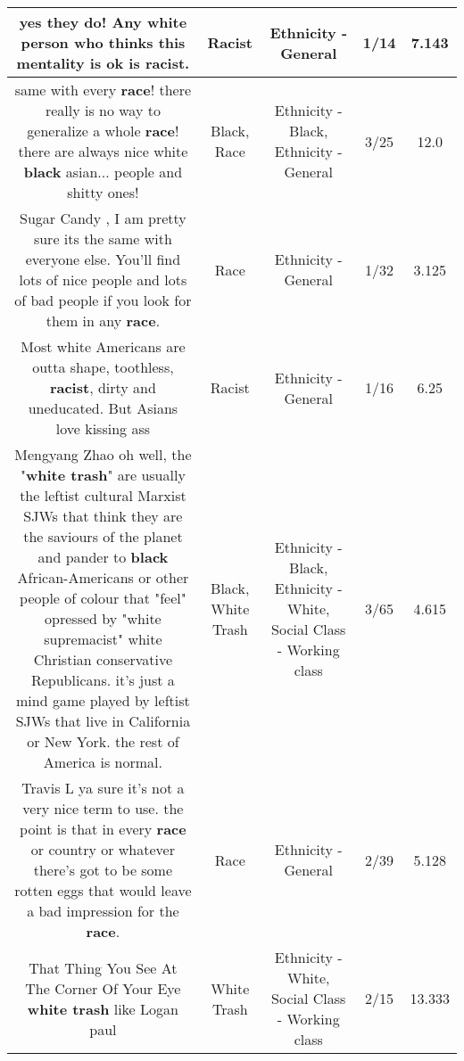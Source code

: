 \documentclass[11pt]{article}
\newlength\mylength
\begin{document}
\begin{center}
\begin{longtable}{|C{.65\mylength}|C{.30\mylength}|C{.12\mylength}|C{.12\mylength}|C{.12\mylength}|}
  \small yes they do! Any white person who thinks this mentality is ok is \textbf{racist}.\normalsize   & Racist & Ethnicity - General & 1/14 & 7.143 \\  \hline
  \small same with every \textbf{race}! there really is no way to generalize a whole \textbf{race}! there are always nice white \textbf{black} asian... people and shitty ones!\normalsize   & Black, Race & Ethnicity - Black, Ethnicity - General & 3/25 & 12.0 \\  \hline
  \small Sugar Candy , I am pretty sure its the same with everyone else. You'll find lots of nice people and lots of bad people if you look for them in any \textbf{race}.\normalsize   & Race & Ethnicity - General & 1/32 & 3.125 \\  \hline
  \small Most white Americans are outta shape, toothless, \textbf{racist}, dirty and uneducated. But Asians love kissing ass\normalsize   & Racist & Ethnicity - General & 1/16 & 6.25 \\  \hline
  \small Mengyang Zhao oh well, the "\textbf{w\textbf{hite trash}}" are usually the leftist cultural Marxist SJWs that think they are the saviours of the planet and pander to \textbf{black} African-Americans or other people of colour that "feel" opressed by "white supremacist" white Christian conservative Republicans. it's just a mind game played by leftist SJWs that live in California or New York. the rest of America is normal.\normalsize   & Black, White Trash & Ethnicity - Black, Ethnicity - White, Social Class - Working class & 3/65 & 4.615 \\  \hline
  \small Travis L ya sure it's not a very nice term to use. the point is that in every \textbf{race} or country or whatever there's got to be some rotten eggs that would leave a bad impression for the \textbf{race}.\normalsize   & Race & Ethnicity - General & 2/39 & 5.128 \\  \hline
  \small That Thing You See At The Corner Of Your Eye \textbf{w\textbf{hite trash}} like Logan paul\normalsize   & White Trash & Ethnicity - White, Social Class - Working class & 2/15 & 13.333 \\  \hline

\end{longtable}
\end{center}
\end{document}
